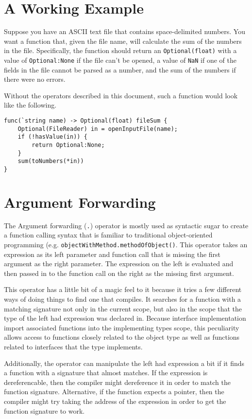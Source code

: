 \documentclass{article}
\begin{document}
	\section{A Working Example}

	Suppose you have an ASCII text file that contains space-delimited numbers.
	You want a function that, given the file name, will calculate the sum of the numbers in the
	file.
	Specifically, the function should return an \verb|Optional(float)| with a value of
	\verb|Optional:None| if the file can't be opened, a value of \verb|NaN| if one of the fields
	in the file cannot be parsed as a number, and the sum of the numbers if there were no errors.

	Without the operators described in this document, such a function would look like the
	following.

	\begin{lstlisting}
func(`string name) -> Optional(float) fileSum {
	Optional(FileReader) in = openInputFile(name);
	if (!hasValue(in)) {
		return Optional:None;
	}
	sum(toNumbers(*in))
}
	\end{lstlisting}

	\section{Argument Forwarding}

	The Argument forwarding (\verb|.|) operator is mostly used as syntactic sugar to create a
	function calling syntax that is familiar to traditional object-oriented programming (e.g.
	\verb|objectWithMethod.methodOfObject()|.
	This operator takes an expression as its left parameter and function call that is missing the
	first argument as the right parameter.
	The expression on the left is evaluated and then passed in to the function call on the right as
	the missing first argument.

	This operator has a little bit of a magic feel to it because it tries a few different ways of
	doing things to find one that compiles.
	It searches for a function with a matching signature not only in the current scope, but also in
	the scope that the type of the left had expression was declared in.
	Because interface implementation import associated functions into the implementing types scope,
	this peculiarity allows access to functions closely related to the object type as well as
	functions related to interfaces that the type implements.

	Additionally, the operator can manipulate the left had expression a bit if it finds a function
	with a signature that almost matches.
	If the expression is dereferencable, then the compiler might dereference it in order to match
	the function signature.
	Alternative, if the function expects a pointer, then the compiler might try taking the address
	of the expression in order to get the function signature to work.
\end{document}

